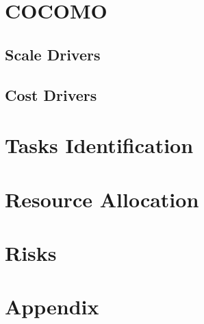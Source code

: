 \documentclass[12pt, a4paper]{article}
\begin{document}
    \newpage
    \section{COCOMO}
        
        
        \subsection{Scale Drivers}
        
        
        \subsection{Cost Drivers}
        
    
    \newpage
    \section{Tasks Identification}
        

    \newpage
    \section{Resource Allocation}
        

    \newpage
    \section{Risks}
        
    
    \newpage
    \section*{Appendix}
    	
\end{document}

